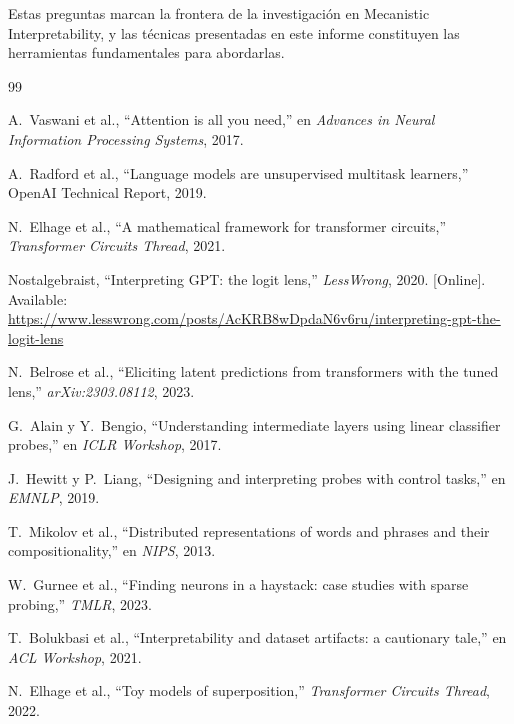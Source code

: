 \documentclass[11pt,a4paper]{report}
\theoremstyle{definition}
\begin{document}
Estas preguntas marcan la frontera de la investigación en Mecanistic Interpretability, y las técnicas presentadas en este informe constituyen las herramientas fundamentales para abordarlas.

\begin{thebibliography}{99}

A.~Vaswani et al., ``Attention is all you need,'' en \emph{Advances in Neural Information Processing Systems}, 2017.

A.~Radford et al., ``Language models are unsupervised multitask learners,'' OpenAI Technical Report, 2019.

N.~Elhage et al., ``A mathematical framework for transformer circuits,'' \emph{Transformer Circuits Thread}, 2021.

Nostalgebraist, ``Interpreting GPT: the logit lens,'' \emph{LessWrong}, 2020. [Online]. Available: \url{https://www.lesswrong.com/posts/AcKRB8wDpdaN6v6ru/interpreting-gpt-the-logit-lens}

N.~Belrose et al., ``Eliciting latent predictions from transformers with the tuned lens,'' \emph{arXiv:2303.08112}, 2023.

G.~Alain y Y.~Bengio, ``Understanding intermediate layers using linear classifier probes,'' en \emph{ICLR Workshop}, 2017.

J.~Hewitt y P.~Liang, ``Designing and interpreting probes with control tasks,'' en \emph{EMNLP}, 2019.

T.~Mikolov et al., ``Distributed representations of words and phrases and their compositionality,'' en \emph{NIPS}, 2013.

W.~Gurnee et al., ``Finding neurons in a haystack: case studies with sparse probing,'' \emph{TMLR}, 2023.

T.~Bolukbasi et al., ``Interpretability and dataset artifacts: a cautionary tale,'' en \emph{ACL Workshop}, 2021.

N.~Elhage et al., ``Toy models of superposition,'' \emph{Transformer Circuits Thread}, 2022.


\end{thebibliography}
\end{document}
